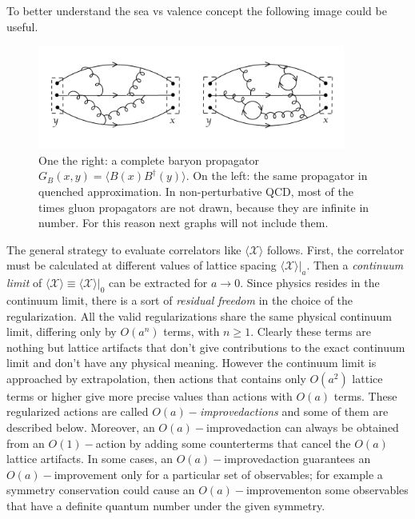 \documentclass[english, LaM, oneside, noexaminfo]{sapthesis}
\newcommand{\la}{\langle}
\newcommand{\ra}{\rangle}
\newcommand{\oaid}{$O(a)-$improved}
\newcommand{\oait}{$O(a)-$improvement}
\begin{document}
To better understand the sea vs valence concept the following image could be useful.
\begin{figure}[h!]
    \centering
    \includegraphics[width=0.9\textwidth]{imgs-MSc-thesis/quenched.png}
    \caption{One the right: a complete baryon propagator $G_B(x,y) = \la B(x) B^\dagger (y) \ra$.
        On the left: the same propagator in quenched approximation.
        In non-perturbative QCD, most of the times gluon propagators are not drawn, because they are infinite in number.
        For this reason next graphs will not include them.}
    \label{fig:quenched-approximation}
\end{figure}
\newline
The general strategy to evaluate correlators like $\la\mathcal{X}\ra$ follows.
First, the correlator must be calculated at different values of lattice spacing $\la\mathcal{X}\ra |_a$.
Then a {\it continuum limit} of $\la\mathcal{X}\ra \equiv \la\mathcal{X}\ra |_0$ can be extracted for $a \rightarrow 0$.
Since physics resides in the continuum limit, there is a sort of \textit{residual freedom} in the choice of the regularization.
All the valid regularizations share the same physical continuum limit, differing only by $O(a^n)$ terms, with $n\ge 1$.
Clearly these terms are nothing but lattice artifacts that don't give contributions to the exact continuum limit and don't have any physical meaning.
However the continuum limit is approached by extrapolation, then actions that contains only $O(a^2)$ lattice terms or higher give more precise values than actions with $O(a)$ terms.
These regularized actions are called {\it \oaid \space actions} and some of them are described below.
Moreover, an \oaid \space action can always be obtained from an $O(1)-$action by adding some counterterms that cancel the $O(a)$ lattice artifacts.
In some cases, an \oaid\space action guarantees an $O(a)-$improvement only for a particular set of observables;
for example a symmetry conservation could cause an \oait\space on some observables that have a definite quantum number under the given symmetry.
\end{document}
